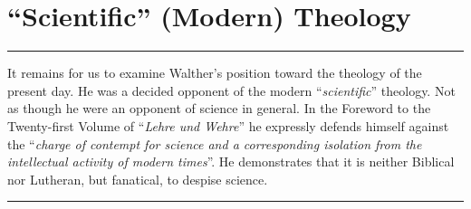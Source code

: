 \chapter{``Scientific'' (Modern) Theology}

\hrule
\vspace{.30cm}

It remains for us to examine Walther’s position toward the theology of the present day.  He was a decided opponent of the modern “\textit{scientific}” theology.  Not as though he were an opponent of science in general.  In the Foreword to the Twenty-first Volume of “\textit{Lehre und Wehre}” he expressly defends himself against the “\textit{charge of contempt for science and a corresponding isolation from the intellectual activity of modern times}”.  He demonstrates that it is neither Biblical nor Lutheran, but fanatical, to despise science.

\vspace{.30cm}
\hrule
\vspace{1.25cm}

